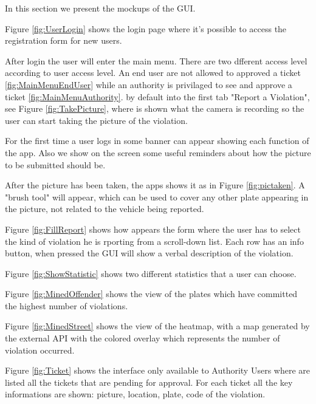 
In this section we present the mockups of the GUI.

Figure \ref{fig:UserLogin} shows the login page where it's possible to access the registration form for new users.

After login the user will enter the main menu. There are two dfferent access level according to user access level. An end user are not allowed to approved a ticket \ref{fig:MainMenuEndUser} while an authority is privilaged to see and approve a ticket \ref{fig:MainMenuAuthority}.
 by default into the first tab "Report a Violation", see Figure \ref{fig:TakePicture}, where is shown what the camera is recording so the user can start taking the picture of the violation.

For the first time a user logs in some banner can appear showing each function of the app. Also we show on the screen some useful reminders about how the picture to be submitted should be.

After the picture has been taken, the apps shows it as in Figure \ref{fig:pictaken}. A  "brush tool" will appear, which can be used to cover any other plate appearing in the picture, not related to the vehicle being reported.

Figure \ref{fig:FillReport} shows how appears the form where the user has to select the kind of violation he is rporting from a scroll-down list. Each row has an info button, when pressed the GUI will show a verbal description of the violation.

Figure  \ref{fig:ShowStatistic} shows two different statistics that a user can choose.

Figure \ref{fig:MinedOffender} shows the view of the plates which have committed the highest number of violations.

Figure \ref{fig:MinedStreet} shows the view of the heatmap, with a map generated by the external API with the colored overlay which represents the number of violation occurred.

Figure \ref{fig:Ticket} shows the interface only available to Authority Users where are listed all the tickets that are pending for approval. For each ticket all the key informations are shown: picture, location, plate, code of the violation.

